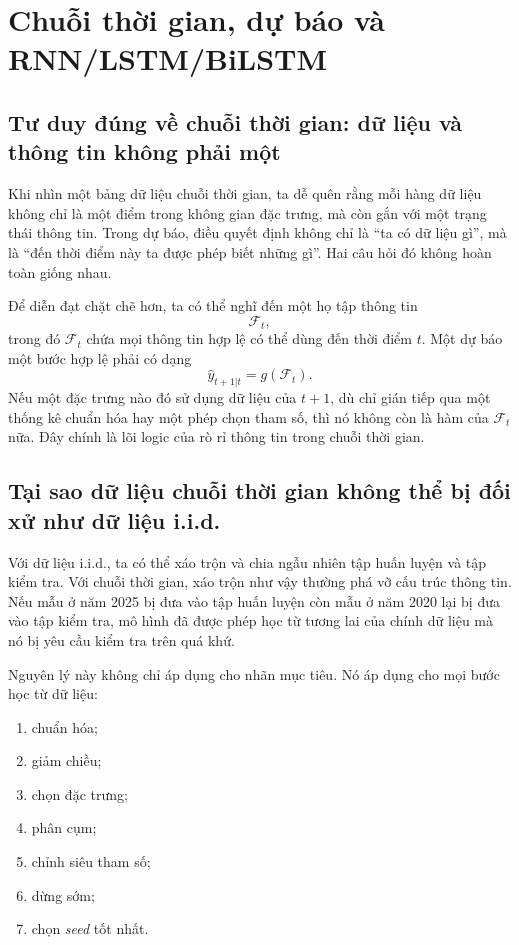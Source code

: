 \chapter{Chuỗi thời gian, dự báo và RNN/LSTM/BiLSTM}

\section{Tư duy đúng về chuỗi thời gian: dữ liệu và thông tin không phải một}

Khi nhìn một bảng dữ liệu chuỗi thời gian, ta dễ quên rằng mỗi hàng dữ liệu không chỉ là một điểm trong không gian đặc trưng, mà còn gắn với một trạng thái thông tin. Trong dự báo, điều quyết định không chỉ là ``ta có dữ liệu gì'', mà là ``đến thời điểm này ta được phép biết những gì''. Hai câu hỏi đó không hoàn toàn giống nhau.

Để diễn đạt chặt chẽ hơn, ta có thể nghĩ đến một họ tập thông tin
\[
\mathcal{F}_t,
\]
trong đó \(\mathcal{F}_t\) chứa mọi thông tin hợp lệ có thể dùng đến thời điểm \(t\). Một dự báo một bước hợp lệ phải có dạng
\[
\hat{y}_{t+1|t}=g(\mathcal{F}_t).
\]
Nếu một đặc trưng nào đó sử dụng dữ liệu của \(t+1\), dù chỉ gián tiếp qua một thống kê chuẩn hóa hay một phép chọn tham số, thì nó không còn là hàm của \(\mathcal{F}_t\) nữa. Đây chính là lõi logic của rò rỉ thông tin trong chuỗi thời gian.

\section{Tại sao dữ liệu chuỗi thời gian không thể bị đối xử như dữ liệu i.i.d.}

Với dữ liệu i.i.d., ta có thể xáo trộn và chia ngẫu nhiên tập huấn luyện và tập kiểm tra. Với chuỗi thời gian, xáo trộn như vậy thường phá vỡ cấu trúc thông tin. Nếu mẫu ở năm 2025 bị đưa vào tập huấn luyện còn mẫu ở năm 2020 lại bị đưa vào tập kiểm tra, mô hình đã được phép học từ tương lai của chính dữ liệu mà nó bị yêu cầu kiểm tra trên quá khứ.

Nguyên lý này không chỉ áp dụng cho nhãn mục tiêu. Nó áp dụng cho mọi bước học từ dữ liệu:

\begin{enumerate}
\item chuẩn hóa;
\item giảm chiều;
\item chọn đặc trưng;
\item phân cụm;
\item chỉnh siêu tham số;
\item dừng sớm;
\item chọn \emph{seed} tốt nhất.
\end{enumerate}


